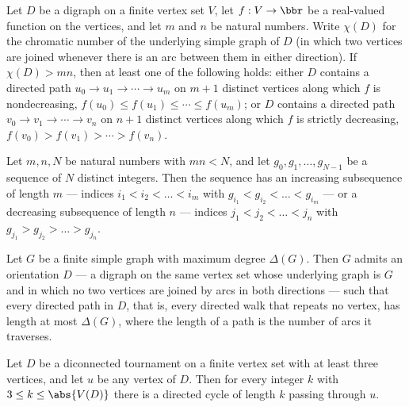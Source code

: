 \begin{theorem}
\label{chvatal_komlos_monotone_directedPath}
\leanok
Let $D$ be a digraph on a finite vertex set $V$, let $f : V \to \bbr$ be a real-valued
function on the vertices, and let $m$ and $n$ be natural numbers. Write $\chi(D)$ for
the chromatic number of the underlying simple graph of $D$ (in which two vertices are
joined whenever there is an arc between them in either direction). If $\chi(D) > mn$,
then at least one of the following holds: either $D$ contains a directed path $u_0 \to
u_1 \to \cdots \to u_m$ on $m+1$ distinct vertices along which $f$ is nondecreasing,
$f(u_0) \le f(u_1) \le \cdots \le f(u_m)$; or $D$ contains a directed path $v_0 \to v_1
\to \cdots \to v_n$ on $n+1$ distinct vertices along which $f$ is strictly decreasing,
$f(v_0) > f(v_1) > \cdots > f(v_n)$.
\end{theorem}

\begin{theorem}
\label{erdos_szekeres_of_chvatal_komlos}
\leanok
Let $m, n, N$ be natural numbers with $mn < N$, and let $g_0, g_1, \dots, g_{N-1}$ be a
sequence of $N$ distinct integers. Then the sequence has an increasing subsequence of
length $m$ — indices $i_1 < i_2 < \dots < i_m$ with $g_{i_1} < g_{i_2} < \dots <
g_{i_m}$ — or a decreasing subsequence of length $n$ — indices $j_1 < j_2 < \dots < j_n$
with $g_{j_1} > g_{j_2} > \dots > g_{j_n}$.
\end{theorem}

\begin{theorem}
\label{exists_orientation_directedPath_le_maxDegree}
\leanok
{}
Let $G$ be a finite simple graph with maximum degree $\Delta(G)$. Then $G$ admits an
orientation $D$ — a digraph on the same vertex set whose underlying graph is $G$ and in
which no two vertices are joined by arcs in both directions — such that every directed
path in $D$, that is, every directed walk that repeats no vertex, has length at most
$\Delta(G)$, where the length of a path is the number of arcs it traverses.
\end{theorem}

\begin{theorem}
\label{moon_vertex_pancyclic}
\leanok
{}
Let $D$ be a diconnected tournament on a finite vertex set with at least three vertices,
and let $u$ be any vertex of $D$. Then for every integer $k$ with $3 \le k \le
\abs{V(D)}$ there is a directed cycle of length $k$ passing through $u$.
\end{theorem}

